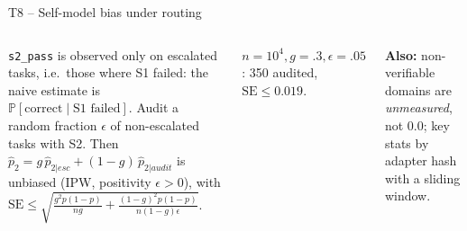 \documentclass[aspectratio=169,10pt]{beamer}
\renewcommand{\Pr}{\mathbb{P}}
\begin{document}
\begin{frame}{T8 -- Self-model bias under routing}
\begin{columns}[T]
\begin{theorem}[T8]\small
\texttt{s2\_pass} is observed only on escalated tasks, i.e.\ those where S1 failed: the naive estimate is $\Pr[\text{correct}\mid\text{S1 failed}]$. Audit a random fraction $\epsilon$ of non-escalated tasks with S2. Then
$\hat p_2=g\,\hat p_{2|esc}+(1-g)\,\hat p_{2|audit}$ is unbiased (IPW, positivity $\epsilon>0$), with
$\mathrm{SE}\le\sqrt{\tfrac{g^2p(1-p)}{ng}+\tfrac{(1-g)^2p(1-p)}{n(1-g)\epsilon}}$.
\end{theorem}
\small $n{=}10^4,g{=}.3,\epsilon{=}.05$: 350 audited, $\mathrm{SE}\le0.019$.
\vspace{2pt}

\textbf{Also:} non-verifiable domains are \emph{unmeasured}, not 0.0; key stats by adapter hash with a sliding window.
\centering
{}
\end{columns}
\end{frame}
\end{document}
